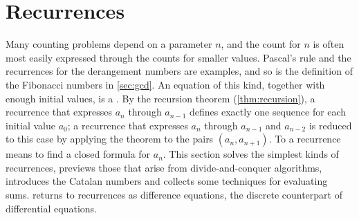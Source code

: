 \begin{figure}
\end{figure}

\section{Recurrences}
\label{sec:recurrences}

Many counting problems depend on a parameter $n$, and the count for $n$ is often most easily expressed through the counts for smaller values. Pascal's rule and the recurrences for the derangement numbers are examples, and so is the definition of the Fibonacci numbers in \cref{sec:gcd}. An equation of this kind, together with enough initial values, is a . By the recursion theorem (\cref{thm:recursion}), a recurrence that expresses $a_n$ through $a_{n-1}$ defines exactly one sequence for each initial value $a_0$; a recurrence that expresses $a_n$ through $a_{n-1}$ and $a_{n-2}$ is reduced to this case by applying the theorem to the pairs $(a_n,a_{n+1})$. To  a recurrence means to find a closed formula for $a_n$. This section solves the simplest kinds of recurrences, previews those that arise from divide-and-conquer algorithms, introduces the Catalan numbers and collects some techniques for evaluating sums.  returns to recurrences as difference equations, the discrete counterpart of differential equations.

